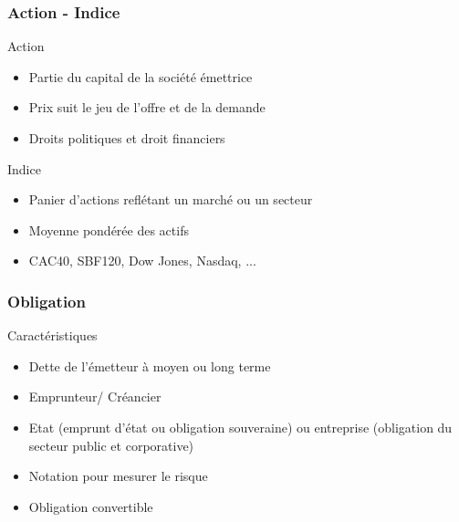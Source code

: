 
\begin{frame}
    \frametitle{Action - Indice}
    \begin{block}{Action}
  	\begin{itemize}
  		\item Partie du capital de la société émettrice
  		\item Prix suit le jeu de l'offre et de la demande
  		\item Droits politiques et droit financiers
  	\end{itemize}
  	\end{block}
  	\pause	
	 \begin{block}{Indice}
  	\begin{itemize}
  		\item Panier d'actions reflétant un marché ou un secteur
  		\item Moyenne pondérée des actifs
  		\item CAC40, SBF120, Dow Jones, Nasdaq, ...
  	\end{itemize}
  	\end{block}
\end{frame}

\begin{frame}
    \frametitle{Obligation}
    \begin{block}{Caractéristiques}
    		\begin{itemize}
    			\item Dette de l'émetteur à moyen ou long terme
    			\item Emprunteur/ Créancier
    			\item Etat (emprunt d'état ou obligation souveraine) ou entreprise (obligation du secteur public et corporative)
    			\item Notation pour mesurer le risque
    			\item Obligation convertible
    		\end{itemize}
	\end{block}  
\end{frame}


